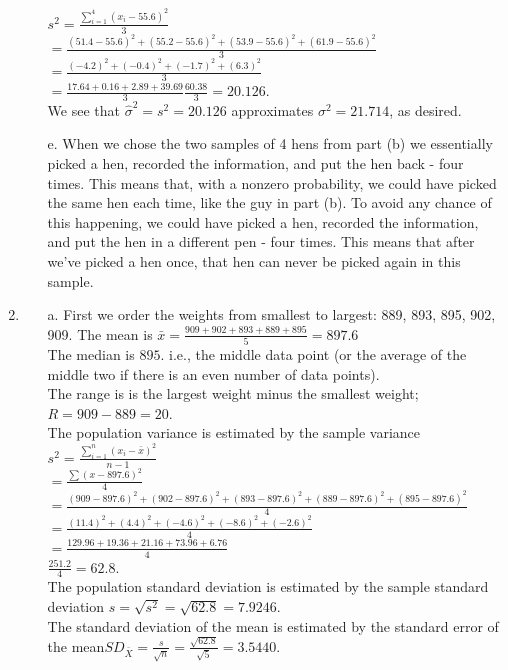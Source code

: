 \documentclass[12pt]{article}
\begin{document}
\begin{enumerate}
\begin{itemize}
 $s^2=\frac{\textstyle \sum_{i=1}^4 (x_i-55.6)^2}{3}$\\
 $=\frac{(51.4-55.6)^2 + (55.2-55.6)^2 + (53.9-55.6)^2 + (61.9-55.6)^2 }{3}$\\
 $=\frac{(-4.2)^2 + (-0.4)^2 + (-1.7)^2 + (6.3)^2}{3}$\\
 $=\frac{17.64 + 0.16 + 2.89 + 39.69}{3}\frac{60.38}{3}=20.126$.\\
 We see that $\hat{\sigma}^2=s^2=20.126$ approximates $\sigma^2=21.714$, as desired.
 \item[e.]
  When we chose the two samples of 4 hens from part (b) we essentially picked a hen, recorded the information, and put the hen back - four times. This means that, with a nonzero probability, we could have picked the same hen each time, like the guy in part (b). To avoid any chance of this happening, we could have picked a hen, recorded the information, and put the hen in a different pen - four times. This means that after we've picked a hen once, that hen can never be picked again in this sample.
\end{itemize}
\item
\begin{itemize}
\item[a.]   First we order the weights from smallest to largest: 889, 893, 895, 902, 909. 
The mean is $\bar{x}=\frac{909+902+893+889+895}{5}=897.6$\\
The median is $895$. i.e., the middle data point (or the average of the middle two if there is an even number of data points).\\
The range is is the largest weight minus the smallest weight; $R=909-889=20$.\\
The population variance is estimated by the sample variance \\
$s^2=\frac{\textstyle \sum_{i=1}^n (x_i-\bar{x})^2}{n-1}$\\
$=\frac{\textstyle \sum (x-897.6)^2}{4}$\\
$=\frac{(909-897.6)^2 + (902-897.6)^2 + (893-897.6)^2 + (889-897.6)^2 + (895-897.6)^2 }{4}$\\
$=\frac{(11.4)^2 + (4.4)^2 + (-4.6)^2 + (-8.6)^2 + (-2.6)^2}{4}$\\
$=\frac{129.96 + 19.36 + 21.16 + 73.96 + 6.76}{4}$\\
$\frac{251.2}{4}=62.8$.\\
The population standard deviation is estimated by the sample standard deviation $s=\sqrt{s^2}=\sqrt{62.8}=7.9246$.\\
The standard deviation of the mean is estimated by the standard error of the mean$SD_{\bar{X}}=\frac{s}{\sqrt{n}}=\frac{\sqrt{62.8}}{\sqrt{5}}=3.5440$.\\

\end{itemize}
\end{enumerate}
\end{document}

